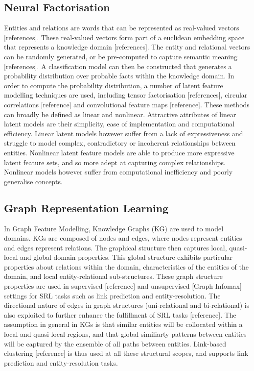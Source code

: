 \subsection{Neural Factorisation} %
Entities and relations are words that can be represented as real-valued vectors [references]. These real-valued vectors form part of a euclidean embedding space that represents a knowledge domain [references]. The entity and relational vectors can be randomly generated, or be pre-computed to capture semantic meaning [references]. A classification model can then be constructed that generates a probability distribution over probable facts within the knowledge domain. In order to compute the probability distribution, a number of latent feature modelling techniques are used, including tensor factorisation [references], circular correlations [reference] and convolutional feature maps [reference]. These methods can broadly be defined as linear and nonlinear. Attractive attributes of linear latent models are their simplicity, ease of implementation and computational efficiency. Linear latent models however suffer from a lack of expressiveness and struggle to model complex, contradictory or incoherent relationships between entities. Nonlinear latent feature models are able to produce more expressive latent feature sets, and so more adept at capturing complex relationships. Nonlinear models however suffer from computational inefficiency and poorly generalise concepts. \newline
\subsection{Graph Representation Learning} %
In Graph Feature Modelling, Knowledge Graphs (KG) are used to model domains. KGs are composed of nodes and edges, where nodes represent entities and edges represent relations. The graphical structure then captures local, quasi-local and global domain properties. This global structure exhibits particular properties about relations within the domain, characteristics of the entities of the domain, and local entity-relational sub-structures. These graph structure properties are used in supervised [reference] and unsupervised [Graph Infomax] settings for SRL tasks such as link prediction and entity-resolution. The directional nature of edges in graph structures (uni-relational and bi-relational) is also exploited to further enhance the fulfillment of SRL tasks [reference]. The assumption in general in KGs is that similar entities will be collocated within a local and quasi-local regions, and that global similiarty patterns between entities will be captured by the ensemble of all paths between entities. Link-based clustering [reference] is thus used at all these structural scopes, and supports link prediction and entity-resolution tasks. 
